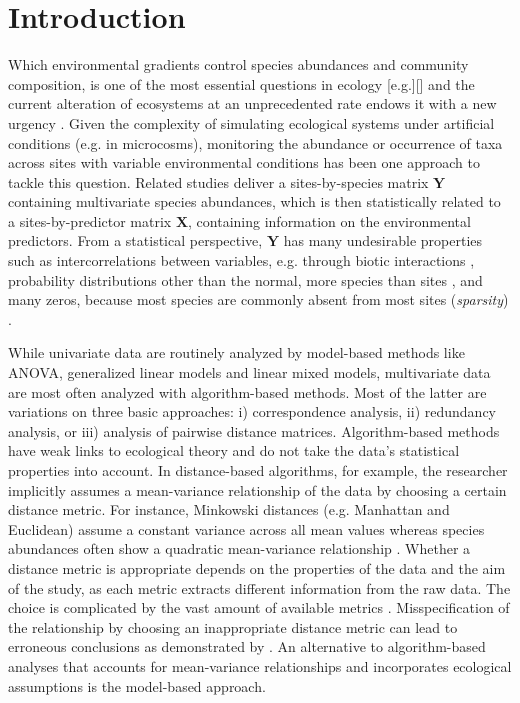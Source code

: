 \documentclass[a4paper,11pt]{article}
\begin{document}
\section{Introduction}

	Which environmental gradients control species abundances and community composition, is one of the most essential questions in ecology [e.g.][]\citet{Clements1907}  and the current alteration of ecosystems at an unprecedented rate endows it with a new urgency \citep{pacifici2015assessing}. 
	Given the complexity of simulating ecological systems under artificial conditions (e.g. in microcosms), monitoring the abundance or occurrence of taxa across sites with variable  environmental conditions has been one approach to tackle this question.
	Related studies deliver a sites-by-species matrix $\mathbf{Y}$ containing multivariate species abundances, which is then statistically related to  a sites-by-predictor matrix $\mathbf{X}$, containing information on the environmental predictors.
	From a statistical perspective, $\mathbf{Y}$ has many undesirable properties such as
	intercorrelations between variables, 
	e.g. through biotic interactions \citep{morales2015inferring},
	probability distributions other than the normal, 
	more species than sites \citep[\textit{high dimensionality}, especially in DNA barcoding studies,][]{cristescu2014barcoding},  
	and many zeros, because most species are commonly absent from most sites (\textit{sparsity}) \citep{mcgill2007species}. 
	
    
    While univariate data are routinely analyzed by model-based methods like ANOVA, generalized linear models and linear mixed models, multivariate data are most often analyzed with algorithm-based methods.
    Most of the latter are variations on three basic approaches: i) correspondence analysis, ii) redundancy analysis, or iii) analysis of pairwise distance matrices. 
    Algorithm-based methods have weak links to ecological theory and do not take the data's statistical properties into account. 
    In distance-based algorithms, for example, the researcher implicitly assumes a mean-variance relationship of the data by choosing a certain distance metric. 
	For instance, Minkowski distances (e.g. Manhattan and Euclidean) assume a constant variance across all mean values \citep{TerBraak1988}
	whereas species abundances often show a quadratic mean-variance relationship \citep{routledge1991taylor, yamamura1999transformation}.
	Whether a distance metric is appropriate depends on the properties of the data and the aim of the study, as each metric extracts different information from the raw data. 
	The choice is complicated by the vast amount of available metrics \citep[see][]{Legendre2012}.
	Misspecification of the relationship by choosing an inappropriate distance metric can lead to erroneous conclusions as demonstrated by \citet{Warton2012}.
	An alternative to algorithm-based analyses that accounts for mean-variance relationships and incorporates ecological assumptions is the model-based approach.\\
 
\end{document}
